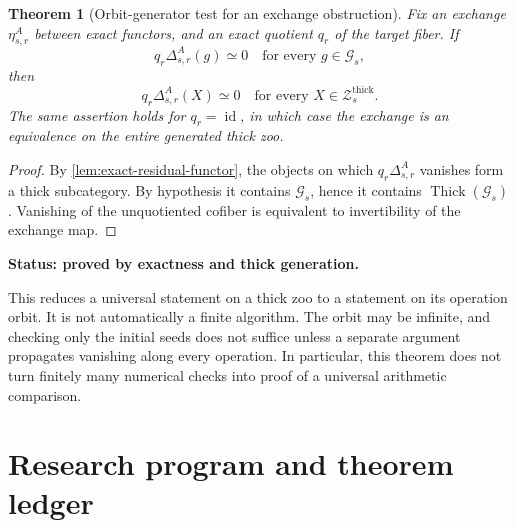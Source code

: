 \documentclass[11pt]{article}
\newtheorem{theorem}{Theorem}[section]
\theoremstyle{definition}
\theoremstyle{remark}
\newcommand{\id}{\operatorname{id}}
\newcommand{\status}[1]{\textbf{Status: #1.}}
\begin{document}
\begin{theorem}[Orbit-generator test for an exchange obstruction]\label{thm:generator-test}
Fix an exchange $\eta^A_{s,r}$ between exact functors, and an exact quotient $q_r$ of the target fiber. If
\[
q_r\Delta^A_{s,r}(g)\simeq0
\quad\text{for every }g\in\mathcal G_s,
\]
then
\[
q_r\Delta^A_{s,r}(X)\simeq0
\quad\text{for every }X\in\mathcal Z_s^{\mathrm{thick}}.
\]
The same assertion holds for $q_r=\id$, in which case the exchange is an equivalence on the entire generated thick zoo.
\end{theorem}

\begin{proof}
By \cref{lem:exact-residual-functor}, the objects on which $q_r\Delta^A_{s,r}$ vanishes form a thick subcategory. By hypothesis it contains $\mathcal G_s$, hence it contains $\operatorname{Thick}(\mathcal G_s)$. Vanishing of the unquotiented cofiber is equivalent to invertibility of the exchange map.
\end{proof}

\status{proved by exactness and thick generation}

This reduces a universal statement on a thick zoo to a statement on its operation orbit. It is not automatically a finite algorithm. The orbit may be infinite, and checking only the initial seeds does not suffice unless a separate argument propagates vanishing along every operation. In particular, this theorem does not turn finitely many numerical checks into proof of a universal arithmetic comparison.


\section{Research program and theorem ledger}
\end{document}
